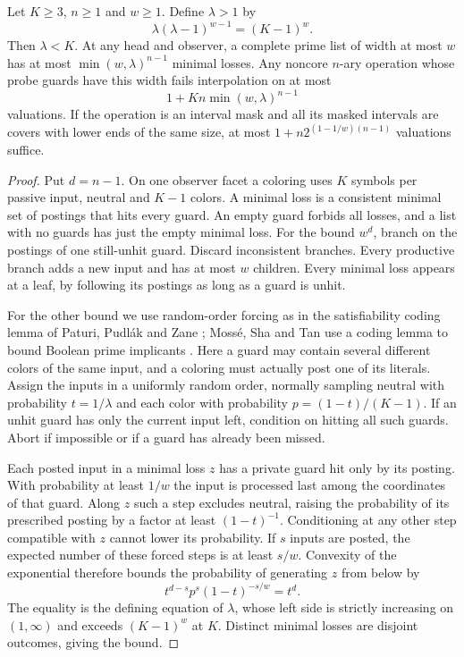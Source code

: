 \begin{theorem}\label{core:thm:prime-width-locality}
Let $K\ge3$, $n\ge1$ and $w\ge1$. Define $\lambda>1$ by
\[
                  \lambda(\lambda-1)^{w-1}=(K-1)^w .
\]
Then $\lambda<K$. At any head and observer, a complete prime list
of width at most $w$ has at most $\min(w,\lambda)^{n-1}$ minimal
losses. Any noncore $n$-ary operation whose probe guards have this
width fails interpolation on at most
\[
                     1+Kn\min(w,\lambda)^{n-1}
\]
valuations. If the operation is an interval mask and all its masked
intervals are covers with lower ends of the same size, at most
$1+n2^{(1-1/w)(n-1)}$ valuations suffice.
\end{theorem}
\begin{proof}
Put $d=n-1$. On one observer facet a coloring uses $K$ symbols per
passive input, neutral and $K-1$ colors. A minimal loss is a consistent
minimal set of postings that hits every guard. An empty guard forbids
all losses, and a list with no guards has just the empty minimal loss.
For the bound $w^d$, branch on the postings of one still-unhit guard.
Discard inconsistent branches. Every productive branch adds a new
input and has at most $w$ children. Every minimal loss appears at a
leaf, by following its postings as long as a guard is unhit.

For the other bound we use random-order forcing as in the
satisfiability coding lemma of Paturi, Pudl{\'a}k and Zane
\cite{PaturiPudlakZane1999}; Moss{\'e}, Sha and Tan use a coding lemma
to bound Boolean prime implicants \cite{MosseShaTan2022}. Here a
guard may contain several different colors of the same input, and
a coloring must actually post one of its literals. Assign the inputs
in a uniformly random order, normally sampling neutral with probability
$t=1/\lambda$ and each color with probability $p=(1-t)/(K-1)$.
If an unhit guard has only the current input left, condition on
hitting all such guards. Abort if impossible or if a guard has
already been missed.

Each posted input in a minimal loss $z$ has a private guard hit only
by its posting. With probability at least $1/w$ the input is processed
last among the coordinates of that guard. Along $z$ such a step
excludes neutral, raising the probability of its prescribed posting
by a factor at least $(1-t)^{-1}$. Conditioning at any other step
compatible with $z$ cannot lower its probability. If $s$ inputs are
posted, the expected number of these forced steps is at least $s/w$.
Convexity of the exponential therefore bounds the probability of
generating $z$ from below by
\[
                 t^{d-s}p^s(1-t)^{-s/w}=t^d .
\]
The equality is the defining equation of $\lambda$, whose left side
is strictly increasing on $(1,\infty)$ and exceeds $(K-1)^w$ at $K$.
Distinct minimal losses are disjoint outcomes, giving the bound.


\end{proof}
